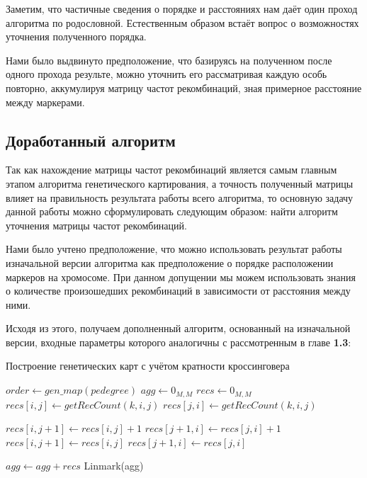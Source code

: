 \documentclass{matmex-diploma-custom}
\begin{document}
Заметим, что частичные сведения о порядке и расстояниях нам даёт один
проход алгоритма по родословной. Естественным образом встаёт вопрос о
возможностях уточнения полученного порядка.

Нами было выдвинуто предположение, что базируясь на полученном после
одного прохода результе, можно уточнить его рассматривая каждую особь
повторно, аккумулируя матрицу частот рекомбинаций, зная примерное
расстояние между маркерами.

\subsection{Доработанный алгоритм}

Так как нахождение матрицы частот рекомбинаций является самым главным
этапом алгоритма генетического картирования, а точность полученный
матрицы влияет на правильность результата работы всего алгоритма, то
основную задачу данной работы можно сформулировать следующим образом:
найти алгоритм уточнения матрицы частот рекомбинаций.

Нами было учтено предположение, что можно использовать результат
работы изначальной версии алгоритма как предположение о порядке
расположении маркеров на хромосоме. При данном допущении мы можем
использовать знания о количестве произошедших рекомбинаций в
зависимости от расстояния между ними.

Исходя из этого, получаем дополненный алгоритм, основанный на
изначальной версии, входные параметры которого аналогичны с
рассмотренным в главе \textbf{1.3}:

\begin{algorithm}
  \caption{Построение генетических карт с учётом кратности кроссинговера}
  \label{newalgo}
   \begin{algorithmic}[1]
    \State $order \gets gen\_map(pedegree)$
    \State $agg \gets 0_{M, M}$
    \State $recs \gets 0_{M, M}$
      \State $recs[i, j] \gets getRecCount(k, i, j)$
      \State $recs[j, i] \gets getRecCount(k, i, j)$
    \EndFor
    \EndFor


    \State $recs[i, j+1] \gets recs[i, j] +1$
    \State $recs[j+1, i] \gets recs[j, i] +1$
    \EndIf
    \State $recs[i, j+1] \gets recs[i, j]$
    \State $recs[j+1, i] \gets recs[j, i]$
    \EndIf

    \EndFor
    \EndFor
    \State $agg \gets agg + recs$
    \EndFor
    \State \Return Linmark(agg)
    \EndFunction
  \end{algorithmic}
\end{algorithm}
\end{document}
